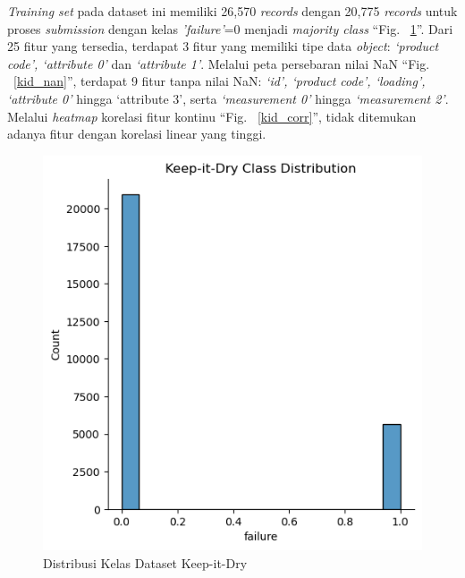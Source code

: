 \documentclass[conference]{IEEEtran}
\begin{document}
\textit{Training set} pada dataset ini memiliki 26,570 \textit{records} dengan 20,775 \textit{records} untuk proses \textit{submission} dengan kelas \textit{'failure'}=0 menjadi \textit{majority class} ``Fig. ~\ref{kid_distribution}''. Dari 25 fitur yang tersedia, terdapat 3 fitur yang memiliki tipe data \textit{object}: 
\textit{‘product code’, ‘attribute 0’}  dan \textit{‘attribute 1’}. Melalui peta persebaran nilai NaN ``Fig. ~\ref{kid_nan}'', terdapat 9 fitur tanpa nilai NaN: \textit{‘id’, ‘product code’, ‘loading’, ‘attribute 0’} hingga ‘attribute 3’, serta \textit{‘measurement 0’} hingga \textit{‘measurement 2’}. 
Melalui \textit{heatmap} korelasi fitur kontinu ``Fig. ~\ref{kid_corr}'', tidak ditemukan adanya fitur dengan korelasi linear yang tinggi.

\begin{figure}[htbp]
    \centerline{\includegraphics[width=\linewidth, scale=0.5]{KID_Class_Distribution.png}}
    \caption{Distribusi Kelas Dataset Keep-it-Dry}
    \label{kid_distribution}
\end{figure}
\end{document}
